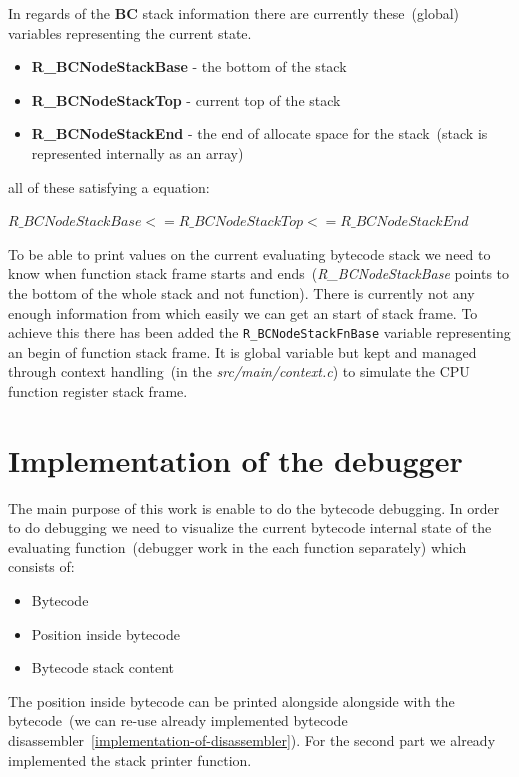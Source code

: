 \documentclass[thesis=M,english]{FITthesis}[2018/10/20]
\newcommand{\code}[1]{\texttt{#1}}
\begin{document}
In regards of the \textbf{BC} stack information there are currently these~(global) variables representing the current state.
 
\begin{itemize}
	\item \textbf{R{\_}BCNodeStackBase} - the bottom of the stack
	\item \textbf{R{\_}BCNodeStackTop} - current top of the stack
	\item \textbf{R{\_}BCNodeStackEnd} - the end of allocate space for the stack~(stack is represented internally as an array)
\end{itemize}

all of these satisfying a equation:

$R{\_}BCNodeStackBase <= R{\_}BCNodeStackTop <= R{\_}BCNodeStackEnd$


To be able to print values on the current evaluating bytecode stack we need to know when function stack frame starts and ends~(\textit{R{\_}BCNodeStackBase} points to the bottom of the whole stack and not function). There is currently not any enough information from which easily we can get an start of stack frame. To achieve this there has been added the \code{R{\_}BCNodeStackFnBase} variable representing an begin of function stack frame. It is global variable but kept and managed through context handling~(in the \textit{src/main/context.c}) to simulate the CPU function register stack frame.

\section{Implementation of the debugger}\label{implementation-of-debugger}

The main purpose of this work is enable to do the bytecode debugging. In order to do debugging we need to visualize the current bytecode internal state of the evaluating function~(debugger work in the each function separately) which consists of:

\begin{itemize}
	\item Bytecode
	\item Position inside bytecode
	\item Bytecode stack content
\end{itemize}

The position inside bytecode can be printed alongside alongside with the bytecode~(we can re-use already implemented bytecode disassembler~\ref{implementation-of-disassembler}). For the second part we already implemented the stack printer function.
\end{document}
